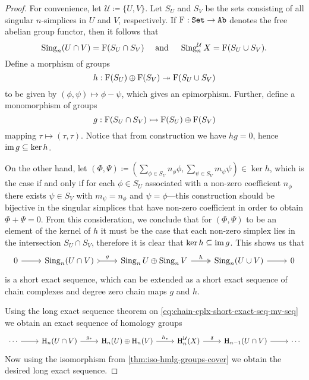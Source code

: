 \begin{proof}
For convenience, let \(\mathcal{U} \coloneq \{U, V\}\). Let \(S_U\) and \(S_V\) be the sets
consisting of all singular \(n\)-simplices in \(U\) and \(V\), respectively. If
\(\operatorname F: {\texttt{Set}} \to {\texttt{Ab}}\) denotes the free abelian group functor, then it
follows that
\[
\operatorname{Sing}_n (U \cap V) = \operatorname F(S_U \cap S_V)
\quad
\text{ and }
\quad
\operatorname{Sing}_n^{\mathcal{U}} X = \operatorname F(S_U \cup S_V).
\]
Define a morphism of groups
\[
h: \operatorname F(S_U) \oplus \operatorname F(S_V) \twoheadrightarrow \operatorname F(S_U \cup S_V)
\]
to be given by \((\phi, \psi) \mapsto \phi - \psi\), which gives an epimorphism. Further,
define a monomorphism of groups
\[
g: \operatorname F(S_U \cap S_V) \rightarrowtail \operatorname F(S_U) \oplus \operatorname F(S_V)
\]
mapping \(\tau \mapsto (\tau, \tau)\). Notice that from construction we have
\(h g = 0\), hence \(\operatorname{im} g \subseteq \ker h\).

On the other hand, let
\((\Phi, \Psi) \coloneq (\sum_{\phi \in S_U} n_{\phi} \phi, \sum_{\psi \in S_{V}} m_{\psi} \psi) \in \ker h\), which is the
case if and only if for each \(\phi \in S_U\) associated with a non-zero coefficient
\(n_{\phi}\) there exists \(\psi \in S_V\) with \(m_{\psi} = n_{\phi}\) and
\(\psi = \phi\)---this construction should be bijective in the singular simplices that
have non-zero coefficient in order to obtain \(\Phi + \Psi = 0\). From this
consideration, we conclude that for \((\Phi, \Psi)\) to be an element of the kernel of
\(h\) it must be the case that each non-zero simplex lies in the intersection
\(S_U \cap S_V\), therefore it is clear that \(\ker h \subseteq \operatorname{im} g\). This shows us that
\begin{equation}\label{eq:chain-cplx-short-exact-seq-mv-seq}
\begin{tikzcd}
0 \ar[r]
&\Sing_n(U \cap V)
\ar[r, tail, "g"]
&\Sing_n U \oplus \Sing_n V
\ar[r, two heads, "h"]
&\Sing_n(U \cup V)
\ar[r]
&0
\end{tikzcd}
\end{equation}
is a short exact sequence, which can be extended as a short exact sequence of
chain complexes and degree zero chain maps \(g\) and \(h\).

Using the long exact sequence theorem on
\cref{eq:chain-cplx-short-exact-seq-mv-seq} we obtain an exact sequence of
homology groups
{\small
\[
\begin{tikzcd}
\cdots \ar[r]
&\Hmlg_n(U \cap V) \ar[r, "g_{*}"]
&\Hmlg_n(U) \oplus \Hmlg_n(V) \ar[r, "h_{*}"]
&\Hmlg_n^{\mathcal{U}}(X) \ar[r, "\delta"]
&\Hmlg_{n-1}(U \cap V) \ar[r]
&\cdots
\end{tikzcd}
\]
}
Now using the isomorphism from \cref{thm:iso-hmlg-groups-cover} we obtain the
desired long exact sequence.
\end{proof}

